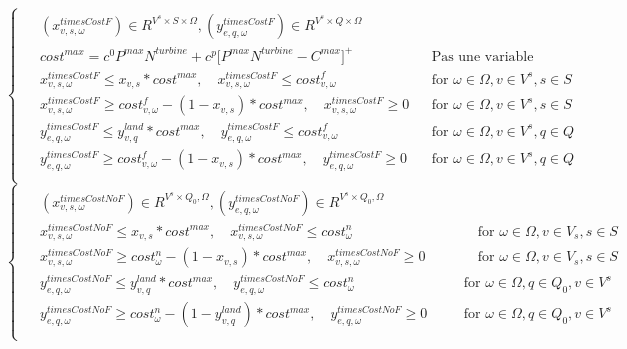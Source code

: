 \documentclass[a4paper,12pt]{article}
\begin{document}
    \begin{equation}
        \begin{cases}
            \begin{alignedat}{2}
                & (x_{v,s,\omega}^{timesCostF}) \in R^{V^{s} \times S \times \Omega},(y_{e,q, \omega}^{timesCostF}) \in R^{V^{s} \times Q \times \Omega} \\
                & cost^{max} = c^0  P^{max}  N^{turbine} + c^p  \lbrack P^{max} N^{turbine} - C^{max} \rbrack ^+ && \text{Pas une variable} \\
                & x_{v,s,\omega}^{timesCostF} \leq x_{v,s} * cost^{max}, \quad x_{v,s,\omega}^{timesCostF} \leq cost_{v, \omega}^{f} && \text{for } \omega \in\Omega, v \in V^{s}, s \in S\\
                & x_{v,s,\omega}^{timesCostF} \geq cost_{v, \omega}^{f} - (1 - x_{v,s})*cost^{max}, \quad x_{v,s,\omega}^{timesCostF} \geq 0 && \text{for } \omega \in\Omega, v \in V^{s}, s \in S\\
                & y_{e,q,\omega}^{timesCostF} \leq y_{v,q}^{land}*cost^{max}, \quad y_{e,q,\omega}^{timesCostF} \leq cost_{v, \omega}^{f} && \text{for } \omega \in\Omega, v \in V^{s}, q \in Q\\
                & y_{e,q,\omega}^{timesCostF} \geq cost_{v, \omega}^{f} - (1 - x_{v,s})*cost^{max}, \quad y_{e,q,\omega}^{timesCostF} \geq 0  && \text{for } \omega \in\Omega, v \in V^{s}, q \in Q\\
            \end{alignedat}
        \end{cases}
    \end{equation}
    \begin{equation}
        \begin{cases}
            \begin{alignedat}{2}
                & (x_{v,s,\omega}^{timesCostNoF}) \in R^{V^{s} \times Q_{0}, \Omega}, (y_{e,q,\omega}^{timesCostNoF}) \in R^{V^{s} \times Q_{0}, \Omega} \\
                & x_{v,s,\omega}^{timesCostNoF} \leq x_{v,s}*cost^{max}, \quad x_{v,s,\omega}^{timesCostNoF} \leq cost_{\omega} ^n &&\quad \text{for } \omega \in\Omega, v \in V_{s}, s \in S\\
                & x_{v,s,\omega}^{timesCostNoF} \geq cost_{\omega} ^n - (1-x_{v,s})*cost^{max}, \quad x_{v,s,\omega}^{timesCostNoF} \geq 0 &&\quad \text{for } \omega \in\Omega, v \in V_{s}, s \in S\\
                & y_{e,q,\omega}^{timesCostNoF} \leq y_{v,q}^{land} * cost^{max}, \quad y_{e,q,\omega}^{timesCostNoF} \leq cost_{\omega} ^n \quad && \text{for } \omega \in \Omega, q \in Q_{0}, v \in V^{s} \\
                & y_{e,q,\omega}^{timesCostNoF} \geq cost_{\omega} ^n -(1-y_{v,q}^{land})*cost^{max}, \quad  y_{e,q,\omega}^{timesCostNoF} \geq 0 \quad && \text{for } \omega \in\Omega, q \in Q_{0}, v \in V^{s}\\
            \end{alignedat}
        \end{cases}
    \end{equation}
\end{document}
